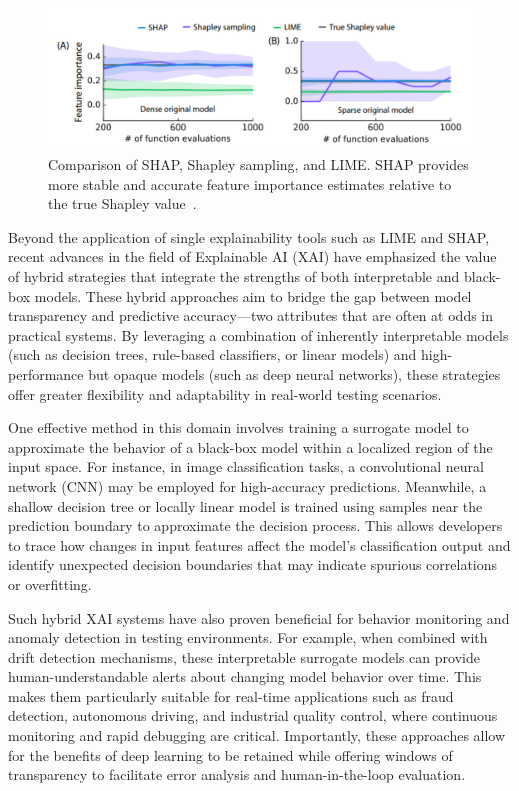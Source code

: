 \documentclass[manuscript,screen,review]{acmart}
\begin{document}
\begin{figure}[htbp]
  \centering
  \includegraphics[width=0.85\linewidth]{picture/5.2fig2.pdf}
  \caption{Comparison of SHAP, Shapley sampling, and LIME. SHAP provides more stable and accurate feature importance estimates relative to the true Shapley value~\cite{Lundberg2017}.}
  \label{fig:shap}
\end{figure}

Beyond the application of single explainability tools such as LIME and SHAP, recent advances in the field of Explainable AI (XAI) have emphasized the value of hybrid strategies that integrate the strengths of both interpretable and black-box models. These hybrid approaches aim to bridge the gap between model transparency and predictive accuracy---two attributes that are often at odds in practical systems. By leveraging a combination of inherently interpretable models (such as decision trees, rule-based classifiers, or linear models) and high-performance but opaque models (such as deep neural networks), these strategies offer greater flexibility and adaptability in real-world testing scenarios.

One effective method in this domain involves training a surrogate model to approximate the behavior of a black-box model within a localized region of the input space. For instance, in image classification tasks, a convolutional neural network (CNN) may be employed for high-accuracy predictions. Meanwhile, a shallow decision tree or locally linear model is trained using samples near the prediction boundary to approximate the decision process. This allows developers to trace how changes in input features affect the model's classification output and identify unexpected decision boundaries that may indicate spurious correlations or overfitting.

Such hybrid XAI systems have also proven beneficial for behavior monitoring and anomaly detection in testing environments. For example, when combined with drift detection mechanisms, these interpretable surrogate models can provide human-understandable alerts about changing model behavior over time. This makes them particularly suitable for real-time applications such as fraud detection, autonomous driving, and industrial quality control, where continuous monitoring and rapid debugging are critical. Importantly, these approaches allow for the benefits of deep learning to be retained while offering windows of transparency to facilitate error analysis and human-in-the-loop evaluation.
\end{document}
